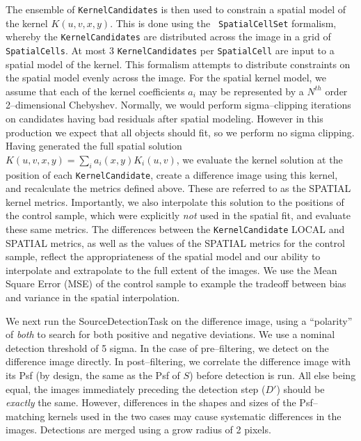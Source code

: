 \documentclass[prd, nofootinbib, floatfix, 11pt,tightenlines,times]{article}
\begin{document}
The ensemble of {\tt KernelCandidates} is then used to constrain a
spatial model of the kernel $K(u,v,x,y)$.  This is done using the {\tt
  SpatialCellSet} formalism, whereby the {\tt KernelCandidates} are
distributed across the image in a grid of {\tt SpatialCells}.  At most
3 {\tt KernelCandidates} per {\tt SpatialCell} are input to a spatial
model of the kernel.  This formalism attempts to distribute
constraints on the spatial model evenly across the image.  For the
spatial kernel model, we assume that each of the kernel coefficients
$a_i$ may be represented by a $N^{th}$ order 2--dimensional Chebyshev.
Normally, we would perform sigma--clipping iterations on candidates
having bad residuals after spatial modeling.  However in this
production we expect that all objects should fit, so we perform no
sigma clipping.  Having generated the full spatial solution
$K(u,v,x,y) = \sum_i a_i(x,y) K_i(u,v)$, we evaluate the kernel
solution at the position of each {\tt KernelCandidate}, create a
difference image using this kernel, and recalculate the metrics
defined above.  These are referred to as the SPATIAL kernel metrics.
Importantly, we also interpolate this solution to the positions of the
control sample, which were explicitly {\it not} used in the spatial
fit, and evaluate these same metrics.  The differences between the
{\tt KernelCandidate} LOCAL and SPATIAL metrics, as well as the values
of the SPATIAL metrics for the control sample, reflect the
appropriateness of the spatial model and our ability to interpolate
and extrapolate to the full extent of the images.  We use the Mean
Square Error (MSE) of the control sample to example the tradeoff
between bias and variance in the spatial interpolation.

We next run the SourceDetectionTask on the difference image, using a
``polarity'' of {\it both} to search for both positive and negative
deviations.  We use a nominal detection threshold of 5 sigma.  In the
case of pre--filtering, we detect on the difference image directly.
In post--filtering, we correlate the difference image with its Psf (by
design, the same as the Psf of $S$) before detection is run.  All else
being equal, the images immediately preceding the detection step
($D'$) should be {\it exactly} the same.  However, differences in the
shapes and sizes of the Psf--matching kernels used in the two cases
may cause systematic differences in the images.  Detections are merged
using a grow radius of 2 pixels.
\end{document}
